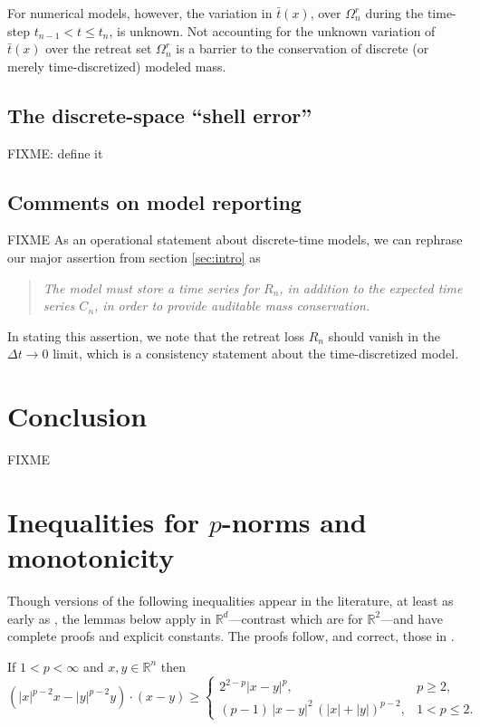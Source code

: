 \documentclass[final,leqno,onefignum,onetabnum]{siamltex1213bueler}
\newcommand\RR{\mathbb{R}}
\begin{document}
For numerical models, however, the variation in $\bar t(x)$, over $\Omega_n^r$ during the time-step $t_{n-1} < t \le t_n$, is unknown.  Not accounting for the unknown variation of $\bar t(x)$ over the retreat set $\Omega_n^r$ is a barrier to the conservation of discrete (or merely time-discretized) modeled mass.

\subsection{The discrete-space ``shell error''}  \label{subsec:shellerror}  FIXME: define it

\subsection{Comments on model reporting}  \label{subsec:comments}  FIXME As an operational statement about discrete-time models, we can rephrase our major assertion from section \ref{sec:intro} as
\begin{quote}
\emph{The model must store a time series for $R_n$, in addition to the expected time series $C_n$, in order to provide auditable mass conservation.}
\end{quote}
In stating this assertion, we note that the retreat loss $R_n$ should vanish in the $\Delta t\to 0$ limit, which is a consistency statement about the time-discretized model.


\section{Conclusion} \label{sec:conclusion}  FIXME






\appendix

\section{Inequalities for $p$-norms and monotonicity}   Though versions of the following inequalities appear in the literature, at least as early as \cite{GlowinskiMarroco1975}, the lemmas below apply in $\RR^d$---contrast \cite{BarrettLiu1993,GlowinskiMarroco1975} which are for $\RR^2$---and have complete proofs and explicit constants.  The proofs follow, and correct, those in \cite[Appendix A]{Peral1997}.

\begin{lemma}  \label{lem:pinequality}  If $1<p<\infty$ and $x,y\in\RR^n$ then
\begin{equation}
\left(|x|^{p-2} x - |y|^{p-2} y\right)\cdot(x-y) \ge
   \begin{cases}
       2^{2-p} |x-y|^p, & p\ge 2, \\
       (p-1)\, |x-y|^2 \, \left(|x|+|y|\right)^{p-2}, & 1 < p \le 2.
   \end{cases} \label{eq:pinequality}
\end{equation}
\end{lemma}
\end{document}
